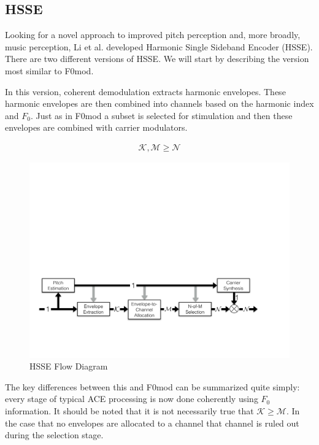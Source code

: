 \documentclass [11pt, proquest,oneside] {ganter_thesis}[2015/03/03]
\begin{document}
\subsection{HSSE}

Looking for a novel approach to improved pitch perception and, more broadly, music perception, Li et al. \cite{li2010harmonic} developed Harmonic Single Sideband Encoder (HSSE).  There are two different versions of HSSE.  We will start by describing the version most similar to F0mod.

In this version, coherent demodulation extracts harmonic envelopes.  These harmonic envelopes are then combined into channels based on the harmonic index and $F_0$.  Just as in F0mod a subset is selected for stimulation and then these envelopes are combined with carrier modulators.

\begin{align}
\mathcal{K}, \mathcal{M} \geq \mathcal{N} \nonumber
\end{align}

\begin{figure}[!ht]
  \centering
    \includegraphics[width=1\textwidth]{HSSE_flow_diagram_noPhase}   
    \caption{HSSE Flow Diagram}\label{fig:HSSE_flow_1}
\end{figure}

The key differences between this and F0mod can be summarized quite simply: every stage of typical ACE processing is now done coherently using $F_0$ information.  It should be noted that it is not necessarily true that $\mathcal{K} \geq \mathcal{M}$.  In the case that no envelopes are allocated to a channel that channel is  ruled out during the selection stage.
\end{document}
